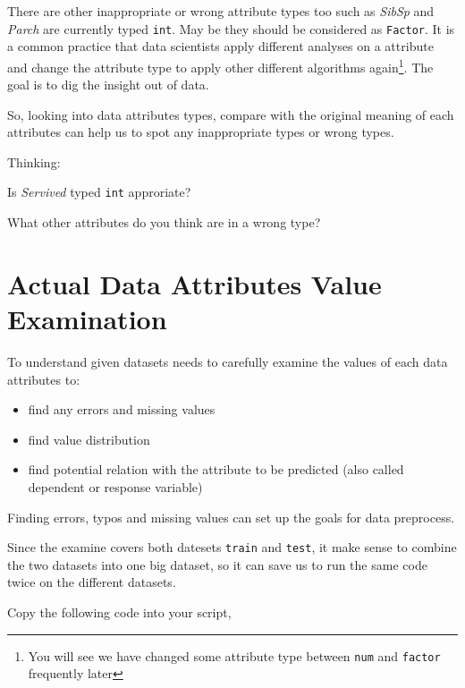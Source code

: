 \documentclass[
]{book}
\providecommand{\tightlist}{%
  \setlength{\itemsep}{0pt}\setlength{\parskip}{0pt}}
\begin{document}
There are other inappropriate or wrong attribute types too such as \emph{SibSp} and \emph{Parch} are currently typed \texttt{int}. May be they should be considered as \texttt{Factor}. It is a common practice that data scientists apply different analyses on a attribute and change the attribute type to apply other different algorithms again\footnote{You will see we have changed some attribute type between \texttt{num} and \texttt{factor} frequently later}. The goal is to dig the insight out of data.

So, looking into data attributes types, compare with the original meaning of each attributes can help us to spot any inappropriate types or wrong types.

\begin{rmdthinking}
Thinking:

Is \emph{Servived} typed \texttt{int} approriate?

What other attributes do you think are in a wrong type?
\end{rmdthinking}

\hypertarget{attvalue}{%
\section{Actual Data Attributes Value Examination}\label{attvalue}}

To understand given datasets needs to carefully examine the values of each data attributes to:

\begin{itemize}
\tightlist
\item
  find any errors and missing values
\item
  find value distribution
\item
  find potential relation with the attribute to be predicted (also called dependent or response variable)
\end{itemize}

Finding errors, typos and missing values can set up the goals for data preprocess.

Since the examine covers both datesets \texttt{train} and \texttt{test}, it make sense to combine the two datasets into one big dataset, so it can save us to run the same code twice on the different datasets.

Copy the following code into your script,
\end{document}
